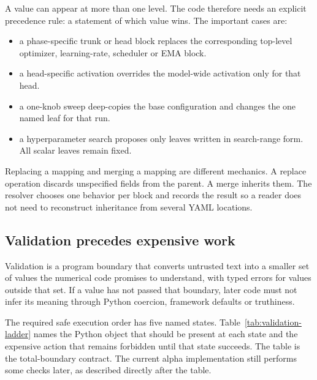 \documentclass[10pt,aps,prd,twocolumn,nofootinbib]{revtex4-2}
\begin{document}
A value can appear at more than one level.  The code therefore needs an
explicit precedence rule: a statement of which value wins.  The important
cases are:
\begin{itemize}
  \item a phase-specific trunk or head block replaces the corresponding
        top-level optimizer, learning-rate, scheduler or EMA block.
  \item a head-specific activation overrides the model-wide activation only
        for that head.
  \item a one-knob sweep deep-copies the base configuration and changes the
        one named leaf for that run.
  \item a hyperparameter search proposes only leaves written in search-range
        form.  All scalar leaves remain fixed.
\end{itemize}
Replacing a mapping and merging a mapping are different mechanics.  A replace
operation discards unspecified fields from the parent.  A merge inherits
them.  The resolver chooses one behavior per block and records the result so a
reader does not need to reconstruct inheritance from several YAML locations.

\subsection{Validation precedes expensive work}

Validation is a program boundary that converts untrusted text into a smaller
set of values the numerical code promises to understand, with typed errors for
values outside that set.  If a value has not passed that
boundary, later code must not infer its meaning through Python coercion,
framework defaults or truthiness.

The required safe execution order has five named states.
Table~\ref{tab:validation-ladder} names the Python object that should be
present at each state and the expensive action that remains forbidden until
that state succeeds.  The table is the total-boundary contract.  The current
alpha implementation still performs some checks later, as described directly
after the table.
\end{document}

